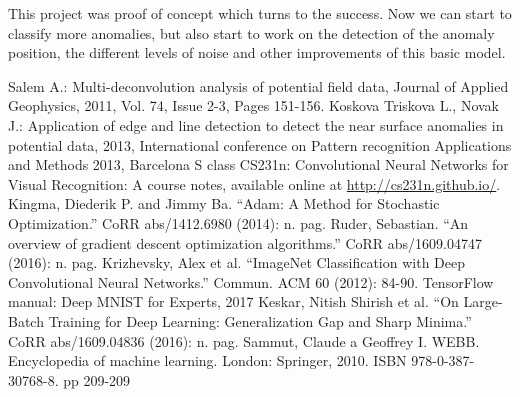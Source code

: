 \documentclass{article}
\begin{document}
This project was proof of concept which turns to the success. Now we can
start to classify more anomalies, but also start to work on the
detection of the anomaly position, the different levels of noise and
other improvements of this basic model.


\begin{thebibliography}{References}
Salem A.: Multi-deconvolution analysis of potential field data, Journal of Applied Geophysics, 2011, Vol. 74, Issue 2-3, Pages 151-156.
 Koskova Triskova L., Novak J.: Application of edge and line detection to detect the near surface anomalies in potential data, 2013, International conference on Pattern recognition Applications and Methods 2013, Barcelona
S class CS231n: Convolutional Neural Networks for Visual Recognition: A course notes, available online at \href{http://cs231n.github.io/}{http://cs231n.github.io/}.
Kingma, Diederik P. and Jimmy Ba. “Adam: A Method for Stochastic Optimization.” CoRR abs/1412.6980 (2014): n. pag.
Ruder, Sebastian. “An overview of gradient descent optimization algorithms.” CoRR abs/1609.04747 (2016): n. pag.
Krizhevsky, Alex et al. “ImageNet Classification with Deep Convolutional Neural Networks.” Commun. ACM 60 (2012): 84-90.
TensorFlow manual: Deep MNIST for Experts, 2017
Keskar, Nitish Shirish et al. “On Large-Batch Training for Deep Learning: Generalization Gap and Sharp Minima.” CoRR abs/1609.04836 (2016): n. pag.
Sammut, Claude a Geoffrey I. WEBB. Encyclopedia of machine learning. London: Springer, 2010. ISBN 978-0-387-30768-8. pp 209-209
\end{thebibliography}
\end{document}
